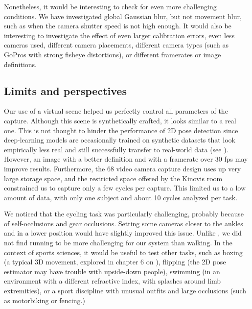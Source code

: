 Nonetheless, it would be interesting to check for even more challenging conditions. We have investigated global Gaussian blur, but not movement blur, such as when the camera shutter speed is not high enough. It would also be interesting to investigate the effect of even larger calibration errors, even less cameras used, different camera placements, different camera types (such as GoPros with strong fisheye distortions), or different framerates or image definitions.


\subsection{Limits and perspectives}

Our use of a virtual scene helped us perfectly control all parameters of the capture. Although this scene is synthetically crafted, it looks similar to a real one. This is not thought to hinder the performance of 2D pose detection since deep-learning models are occasionally trained on synthetic datasets that look empirically less real and still successfully transfer to real-world data (see \cite{Nikolenko2021,Patel2021,Wood2021,Bolanos2021,Varol2017}). However, an image with a better definition and with a framerate over 30 fps may improve results. Furthermore, the 68 video camera capture design uses up very large storage space, and the restricted space offered by the Kinovis room constrained us to capture only a few cycles per capture. This limited us to a low amount of data, with only one subject and about 10 cycles analyzed per task.

We noticed that the cycling task was particularly challenging, probably because of self-occlusions and gear occlusions. Setting some cameras closer to the ankles and in a lower position would have slightly improved this issue. Unlike \cite{D'Antonio2021}, we did not find running to be more challenging for our system than walking. In the context of sports sciences, it would be useful to test other tasks, such as boxing (a typical 3D movement, explored in chapter 6 on  \cite{Pagnon2022c}), flipping (the 2D pose estimator may have trouble with upside-down people), swimming (in an environment with a different refractive index, with splashes around limb extremities), or a sport discipline with unusual outfits and large occlusions (such as motorbiking or fencing.)

